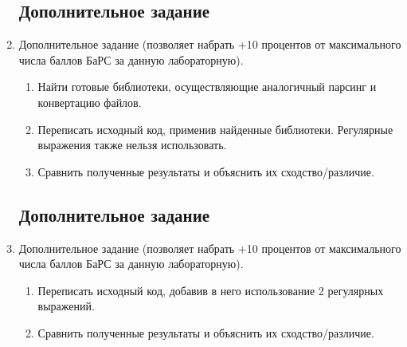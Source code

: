 \documentclass{article}
\begin{document}
\begin{enumerate}
            \subsection{Дополнительное задание }
      \item  Дополнительное задание  (позволяет набрать +10
            процентов от максимального числа баллов БаРС за данную
            лабораторную).
            \begin{enumerate}
                  \item Найти готовые библиотеки, осуществляющие аналогичный
                        парсинг и конвертацию файлов.
                  \item Переписать исходный код, применив найденные
                        библиотеки. Регулярные выражения также нельзя
                        использовать.
                  \item Сравнить полученные результаты и объяснить их
                        сходство/различие.
            \end{enumerate}

            \lstset{language=Python}
            \lstset{language=XML}

            \subsection{Дополнительное задание }
      \item Дополнительное задание  (позволяет набрать +10
            процентов от максимального числа баллов БаРС за данную
            лабораторную).
            \begin{enumerate}
                  \item Переписать исходный код, добавив в него использование
                        2
                        регулярных выражений.
                  \item Сравнить полученные результаты и объяснить их
                        сходство/различие.
            \end{enumerate}


            \lstset{language=Python}
            \lstset{language=XML}


\end{enumerate}
\end{document}
